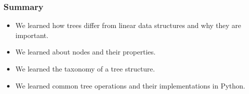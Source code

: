 \documentclass{beamer}
\begin{document}
\begin{frame}
\frametitle{Summary}
\begin{itemize}
\item We learned how trees differ from linear data structures and why they are important.
\item We learned about nodes and their properties.
\item We learned the taxonomy of a tree structure.
\item We learned common tree operations and their implementations in Python.
\end{itemize}
\end{frame}
\end{document}
